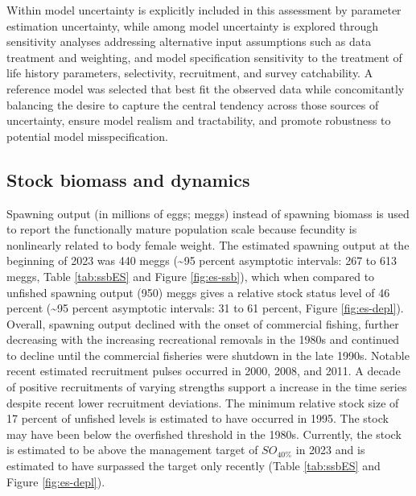 \documentclass[11pt,
  english,
  letterpaper,
]{article}
\begin{document}
Within model uncertainty is explicitly included in this assessment by parameter estimation uncertainty, while among model uncertainty is explored through sensitivity analyses addressing alternative input assumptions such as data treatment and weighting, and model specification sensitivity to the treatment of life history parameters, selectivity, recruitment, and survey catchability. A reference model was selected that best fit the observed data while concomitantly balancing the desire to capture the central tendency across those sources of uncertainty, ensure model realism and tractability, and promote robustness to potential model misspecification.

\hypertarget{stock-biomass-and-dynamics}{%
\subsection*{Stock biomass and dynamics}\label{stock-biomass-and-dynamics}}

Spawning output (in millions of eggs; meggs) instead of spawning biomass is used to report the functionally mature population scale because fecundity is nonlinearly related to body female weight. The estimated spawning output at the beginning of 2023 was 440 meggs (\textasciitilde95 percent asymptotic intervals: 267 to 613 meggs, Table \ref{tab:ssbES} and Figure \ref{fig:es-ssb}), which when compared to unfished spawning output (950) meggs gives a relative stock status level of 46 percent (\textasciitilde95 percent asymptotic intervals: 31 to 61 percent, Figure \ref{fig:es-depl}). Overall, spawning output declined with the onset of commercial fishing, further decreasing with the increasing recreational removals in the 1980s and continued to decline until the commercial fisheries were shutdown in the late 1990s. Notable recent estimated recruitment pulses occurred in 2000, 2008, and 2011. A decade of positive recruitments of varying strengths support a increase in the time series despite recent lower recruitment deviations. The minimum relative stock size of 17 percent of unfished levels is estimated to have occurred in 1995. The stock may have been below the overfished threshold in the 1980s. Currently, the stock is estimated to be above the management target of \(SO_{40\%}\) in 2023 and is estimated to have surpassed the target only recently (Table \ref{tab:ssbES} and Figure \ref{fig:es-depl}).


\end{document}
